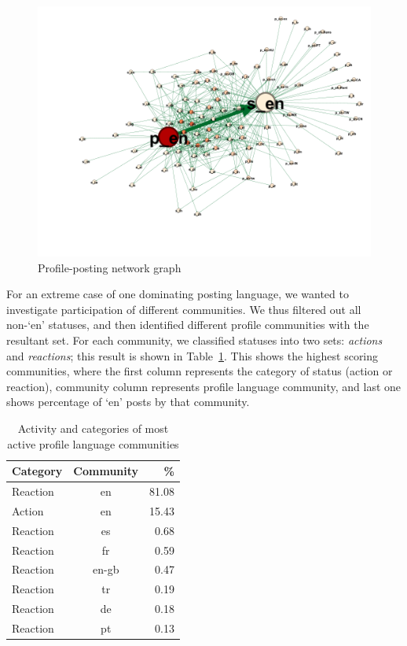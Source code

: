 \documentclass[conference]{IEEEtran}
\begin{document}
\begin{figure}[!h]
\centering
\includegraphics[width=\textwidth]{images/profilepostinggraph.png}
\caption{Profile-posting network graph}
\label{fig:profilepostinggraph}
\end{figure}

For an extreme case of one dominating posting language, we wanted to
investigate participation of different communities. We thus filtered
out all non-`en' statuses, and then identified different profile
communities with the resultant set. For each community, we classified
statuses into two sets: {\emph{actions}} and {\emph{reactions}}; this
result is shown in Table~\ref{tbl:mostactive}. This shows the highest
scoring communities, where the first column represents the category of
status (action or reaction), community column represents profile
language community, and last one shows percentage of `en’ posts by
that community.

\begin{table}[!htb]
\centering
\begin{tabular}{@{}lcr@{}}
\toprule
\textbf{Category} & \textbf{Community} & \textbf{\%} \\ \midrule
Reaction & en & 81.08 \\
Action & en & 15.43 \\
Reaction & es & 0.68 \\
Reaction & fr & 0.59 \\
Reaction & en-gb & 0.47 \\
Reaction & tr & 0.19 \\
Reaction & de & 0.18 \\
Reaction & pt & 0.13 \\ \bottomrule
\end{tabular}
\caption{Activity and categories of most active profile language
  communities}
\label{tbl:mostactive}
\end{table}
\end{document}
